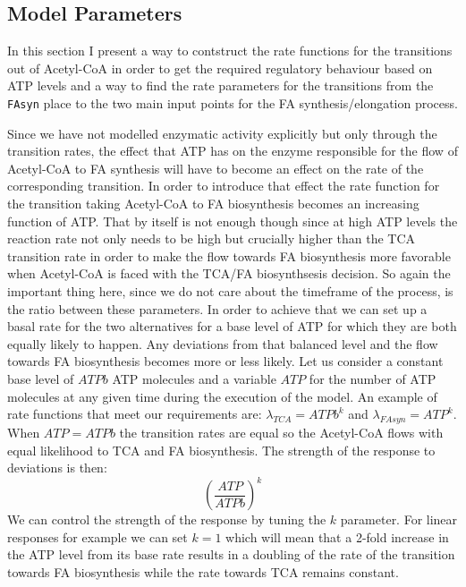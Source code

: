 \subsection{Model Parameters}
In this section I present a way to contstruct the
rate functions for the transitions out of Acetyl-CoA in order to get
the required regulatory behaviour based on ATP levels and a way to
find the rate parameters for the transitions from the \texttt{FAsyn} place
to the two main input points for the FA synthesis/elongation process.

Since we have not modelled enzymatic
activity explicitly but only through the transition rates, the effect that ATP has on the enzyme responsible
for the flow of Acetyl-CoA to FA synthesis will have to become an effect
on the rate of the corresponding transition. In order to introduce
that effect the rate function for the transition taking Acetyl-CoA to FA biosynthesis
becomes an increasing function of ATP. That by itself
is not enough though since at high ATP levels the reaction rate not only
needs to be high but crucially higher than the TCA transition rate in order to
make the flow towards FA biosynthesis more favorable when Acetyl-CoA
is faced with the TCA/FA biosynthsesis decision. So again the
important thing here, since we do not care about the timeframe of the
process, is the ratio between these parameters. In order to achieve
that we can set up a basal rate for the two alternatives for a
base level of ATP for which they are both equally likely to
happen. Any deviations from that balanced level and the flow towards
FA biosynthesis becomes more or less likely. Let us consider a
constant base level of $ATPb$ ATP molecules and a variable $ATP$ for the number
of ATP molecules at any given time during the execution of the
model. An example of rate functions that meet our requirements are:
$\lambda_{TCA} = ATPb^{k}$ and $\lambda_{FAsyn} =
ATP^{k}$. When $ATP=ATPb$ the transition rates are equal so the
Acetyl-CoA flows with equal likelihood to TCA and FA
biosynthesis. The strength of the response to deviations is then:
\begin{equation*}
\left ( \frac{ATP}{ATPb}\right)^{k}
\end{equation*}
We can control the strength of the response by tuning the $k$
parameter. For linear responses for example we can set $k=1$ which
will mean that a 2-fold increase in the ATP level from its base rate
results in a doubling of the
rate of the transition towards FA biosynthesis while the rate towards
TCA remains constant.

